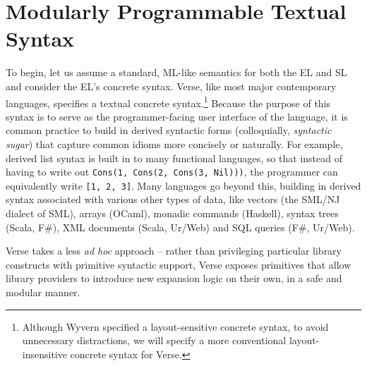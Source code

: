 \section{Modularly Programmable Textual Syntax}\label{sec:syntax}
To begin, let us assume a standard, ML-like semantics for both the EL and SL and consider the EL's concrete syntax. Verse, like most major contemporary languages, specifies a textual concrete syntax.\footnote{Although Wyvern specified a layout-sensitive concrete syntax, to avoid unnecessary distractions, we will specify a more conventional layout-insensitive concrete syntax for Verse.} %
Because the purpose of this syntax is to serve as the programmer-facing user interface of the language, it is common practice to build in  derived syntactic forms (colloquially, \emph{syntactic sugar}) that capture common idioms more concisely or naturally. %
For example, derived list syntax is built in to many functional languages, so that instead of having to write out \lstinline{Cons(1, Cons(2, Cons(3, Nil)))}, the programmer can equivalently write \lstinline{[1, 2, 3]}. Many languages go beyond this, building in derived syntax associated with various other types of data, like vectors (the SML/NJ dialect of SML), arrays (OCaml), monadic commands (Haskell), syntax trees (Scala, F\#), XML documents (Scala, Ur/Web) and SQL queries (F\#, Ur/Web). %

Verse takes a less \emph{ad hoc} approach -- rather than privileging  particular library constructs with primitive syntactic support, Verse exposes primitives that allow library providers to introduce new expansion logic on their own, in a safe and modular manner. %


